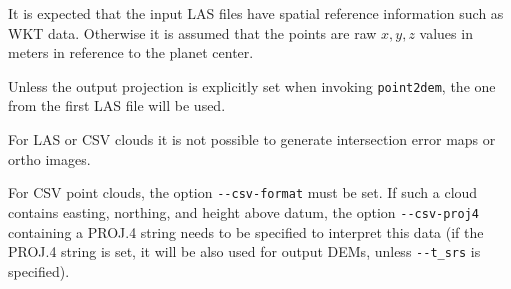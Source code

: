 It is expected that the input LAS files have spatial reference
information such as WKT data. Otherwise it is assumed that the points
are raw $x,y,z$ values in meters in reference to the planet center.

Unless the output projection is explicitly set when invoking \texttt{point2dem},
the one from the first LAS file will be used.

For LAS or CSV clouds it is not possible to generate intersection error
maps or ortho images.

For CSV point clouds, the option \texttt{-\/-csv-format} must be set. If
such a cloud contains easting, northing, and height above datum, the
option \texttt{-\/-csv-proj4} containing a PROJ.4 string needs to be
specified to interpret this data (if the PROJ.4 string is set, it will be also
used for output DEMs, unless \texttt{-\/-t\_srs} is specified).

